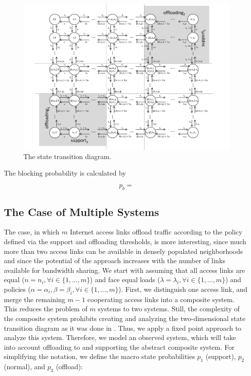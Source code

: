 \begin{figure}[tb]
	\centering
 	\includegraphics[width=1.0\textwidth]{aggregation/performance_model/figures/states}
  	\caption{The state transition diagram.}
  	\label{fig:statetransitions}
\end{figure}

The blocking probability is calculated by

\begin{equation}
  p_b =
\end{equation}

\subsection{The Case of Multiple Systems}\label{sec:aggregation:performance_model:analytical_model:m_systems}

The case, in which $m$ Internet access links offload traffic according to the policy defined via the support and offloading thresholds, is more interesting, since much more than two access links can be available in densely populated neighborhoods and since the potential of the approach increases with the number of links available for bandwidth sharing.
We start with assuming that all access links are equal ($n=n_i, \forall i\in\{1,\ldots,m\}$) and face equal loads ($\lambda=\lambda_i, \forall i\in\{1,\ldots,m\}$) and policies ($\alpha = \alpha_i, \beta = \beta_i, \forall i\in\{1,\ldots,m\}$). First, we distinguish one access link, and merge the remaining $m-1$ cooperating access links into a composite system. This reduces the problem of $m$ systems to two systems. Still, the complexity of the composite system prohibits creating and analyzing the two-dimensional state transition diagram as it was done in \cite{burger2016phycom}. Thus, we apply a fixed point approach to analyze this system.%
Therefore, we model an observed system, which will take into account offloading to and supporting the abstract composite system. For simplifying the notation, we define the macro state probabilities $p_1$ (support), $p_2$ (normal), and $p_3$ (offload):

